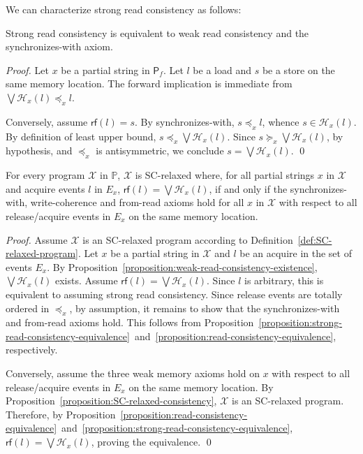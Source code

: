 \documentclass{llncs}
\newcommand{\sP}{\mathsf{P}}
\newcommand{\cH}{\mathcal{H}}
\newcommand{\cX}{\mathcal{X}}
\newcommand{\bbP}{\mathbb{P}}
\begin{document}
We can characterize strong read consistency as follows:

\begin{proposition}
\label{proposition:strong-read-consistency-equivalence}
Strong read consistency is equivalent to weak read consistency and the synchronizes-with axiom.
\end{proposition}
\begin{proof}
Let $x$ be a partial string in $\sP_f$. Let $l$ be a load and $s$ be a store on the same memory location. The forward implication is immediate from $\bigvee \cH_x(l) \preceq_x l$.

Conversely, assume $\mathsf{rf}(l) = s$. By synchronizes-with, $s \preceq_x l$, whence $s \in \cH_x(l)$. By definition of least upper bound, $s \preceq_x \bigvee \cH_x(l)$. Since $s \succeq_x \bigvee \cH_x(l)$, by hypothesis, and $\preceq_x$ is antisymmetric, we conclude $s = \bigvee \cH_x(l)$. \qed
\end{proof}

\begin{theorem}
\label{theorem:SC-relaxed-equivalence}
For every program $\cX$ in $\bbP$, $\cX$ is SC-relaxed where, for all partial strings $x$ in $\cX$ and acquire events $l$ in $E_x$, $\mathsf{rf}(l) = \bigvee \cH_x(l)$, if and only if the synchronizes-with, write-coherence and from-read axioms hold for all $x$ in $\cX$ with respect to all release/acquire events in $E_x$ on the same memory location.
\end{theorem}
\begin{proof}
Assume $\cX$ is an SC-relaxed program according to Definition~\ref{def:SC-relaxed-program}. Let $x$ be a partial string in $\cX$ and $l$ be an acquire in the set of events $E_x$. By Proposition~\ref{proposition:weak-read-consistency-existence}, $\bigvee \cH_x(l)$ exists. Assume $\mathsf{rf}(l) = \bigvee \cH_x(l)$. Since $l$ is arbitrary, this is equivalent to assuming strong read consistency. Since release events are totally ordered in $\preceq_x$, by assumption, it remains to show that the synchronizes-with and from-read axioms hold. This follows from Proposition~\ref{proposition:strong-read-consistency-equivalence}~and~\ref{proposition:read-consistency-equivalence}, respectively.

Conversely, assume the three weak memory axioms hold on $x$ with respect to all release/acquire events in $E_x$ on the same memory location. By Proposition~\ref{proposition:SC-relaxed-consistency}, $\cX$ is an SC-relaxed program. Therefore, by Proposition~\ref{proposition:read-consistency-equivalence}~and~\ref{proposition:strong-read-consistency-equivalence}, $\mathsf{rf}(l) = \bigvee \cH_x(l)$, proving the equivalence. \qed
\end{proof}
\end{document}
